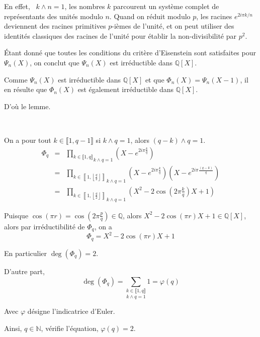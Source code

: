 En effet, \ $k \wedge n = 1$, les nombres $k$ parcourent un syst{\`e}me
complet de repr{\'e}sentants des unit{\'e}s modulo $n$. Quand on r{\'e}duit
modulo $p$, les racines $e^{2 i \pi k / n}$ deviennent des racines primitives
$p$-i{\`e}mes de l'unit{\'e}, et on peut utiliser des identit{\'e}s classiques
des racines de l'unit{\'e} pour {\'e}tablir la non-divisibilit{\'e} par $p^2$.

{\'E}tant donn{\'e} que toutes les conditions du crit{\`e}re d'Eisenstein sont
satisfaites pour $\Psi_n (X)$, on conclut que $\Psi_n (X)$ est
irr{\'e}ductible dans $\mathbb{Q}[X]$.

Comme $\Psi_n (X)$ est irr{\'e}ductible dans $\mathbb{Q}[X]$ et que $\Phi_n
(X) = \Psi_n (X - 1)$, il en r{\'e}sulte que $\Phi_n (X)$ est {\'e}galement
irr{\'e}ductible dans $\mathbb{Q}[X]$.

D'o{\`u} le lemme.

\

On a pour tout $k \in \llbracket 1, q - 1 \rrbracket$ si $k \wedge q = 1$,
alors $(q - k) \wedge q = 1$.
\begin{eqnarray*}
  \Phi_q & = & \underset{k \wedge q = 1}{\underset{k \in \llbracket 1, q
  \rrbracket}{\prod}} \left( X - e^{2 i \pi \frac{k}{q}} \right)\\
  & = & \underset{k \wedge q = 1}{\underset{k \in \left\llbracket 1,
  \left\lfloor \frac{q}{2} \right\rfloor \right\rrbracket}{\prod}} \left( X -
  e^{2 i \pi \frac{k}{q}} \right) \left( X - e^{2 i \pi \frac{(q - k)}{q}}
  \right)\\
  & = & \underset{k \wedge q = 1}{\underset{k \in \left\llbracket 1,
  \left\lfloor \frac{q}{2} \right\rfloor \right\rrbracket}{\prod}} \left( X^2
  - 2 \cos \left( 2 \pi \frac{k}{q} \right) X + 1 \right)
\end{eqnarray*}


Puisque $\cos (\pi r) = \cos \left( 2 \pi \frac{p}{q} \right) \in \mathbb{Q}$,
alors $X^2 - 2 \cos (\pi r) X + 1 \in \mathbb{Q} [X]$, alors par
irr{\'e}ductibilit{\'e} de $\Phi_q$, on a
\[ \Phi_q = X^2 - 2 \cos (\pi r) X + 1 \]


En particulier $\deg (\Phi_q) = 2$.

D'autre part,
\[ \deg (\Phi_q) = \underset{}{\overset{}{}} \underset{k \wedge q =
   1}{\underset{k \in \llbracket 1, q \rrbracket}{\sum}} 1 = \varphi (q) \]


Avec $\varphi$ d{\'e}signe l'indicatrice d'Euler.

Ainsi, $q \in \mathbb{N}$, v{\'e}rifie l'{\'e}quation, $\varphi (q) = 2$.

